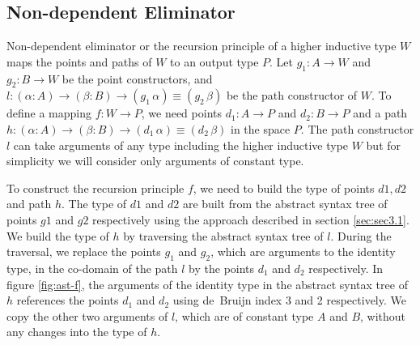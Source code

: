 \documentclass[sigplan,10pt]{acmart}
\begin{document}
\subsection{Non-dependent Eliminator}
\label{sec:sec4.2}

Non-dependent eliminator or the recursion principle of a higher inductive type $W$ maps the points and paths of $W$ to an output type $P$. Let $g_1 : A \rightarrow W$ and $g_2 : B \rightarrow W$ be the point constructors, and $l : (\alpha : A) \rightarrow (\beta : B) \rightarrow (g_1 \, \alpha) \equiv (g_2 \, \beta)$ be the path constructor of $W$. To define a mapping $f : W \rightarrow P$, we need points $d_1 : A \rightarrow P$ and $d_2 : B \rightarrow P$ and a path $h : (\alpha : A) \rightarrow (\beta : B) \rightarrow (d_1 \, \alpha) \equiv (d_2 \, \beta)$ in the space $P$. The path constructor $l$ can take arguments of any type including the higher inductive type $W$ but for simplicity we will consider only arguments of constant type.

To construct the recursion principle $f$, we need to build the type of points $d1, d2$ and path $h$. The type of $d1$ and $d2$ are built from the abstract syntax tree of points $g1$ and $g2$ respectively using the approach described in section \eqref{sec:sec3.1}. We build the type of $h$ by traversing the abstract syntax tree of $l$. During the traversal, we replace the points $g_1$ and $g_2$, which are arguments to the identity type, in the co-domain of the path $l$ by the points $d_1$ and $d_2$ respectively. In figure \eqref{fig:ast-f}, the arguments of the identity type in the abstract syntax tree of $h$ references the points $d_1$ and $d_2$ using de~Bruijn index 3 and 2 respectively. We copy the other two arguments of $l$, which are of constant type $A$ and $B$, without any changes into the type of $h$.
\end{document}
